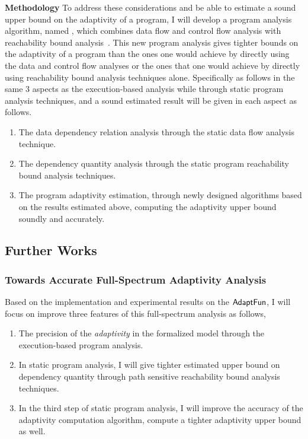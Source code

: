\begin{itemize}
\textbf{Methodology}
To address these considerations and be able to estimate a sound upper bound on the adaptivity of a program, 
I will develop a program analysis algorithm, named {\THESYSTEM}, which combines data flow and control flow analysis with reachability bound analysis~\cite{GulwaniZ10}. 
This new program analysis gives tighter bounds on the adaptivity of a program than the ones one would achieve by directly using the data and control flow analyses or the ones that one would achieve by directly using reachability bound analysis techniques alone. Specifically as follows in the same 3 aspects as the execution-based analysis 
while through static program analysis techniques, and a sound estimated result will be given in each aspect as follows.
\begin{enumerate}
\item The data dependency relation analysis through the static data flow analysis technique.
\item The dependency quantity analysis through the static program reachability bound analysis techniques.
\item The program adaptivity estimation, through newly designed algorithms based on the results estimated above, 
computing the adaptivity upper bound soundly 
and accurately.
\end{enumerate}
\end{itemize}%

\subsection{Further Works}
\subsubsection{Towards Accurate Full-Spectrum Adaptivity Analysis}
\label{subsec:intro-improve}
Based on the implementation and experimental results on the $\textsf{AdaptFun}$,
I will focus on improve three features of this full-spectrum analysis as follows,
\begin{enumerate}
   \item The precision of the \emph{adaptivity} in the formalized model through the execution-based program analysis.

\item  In static program analysis, I will give tighter estimated upper bound on dependency quantity through 
path sensitive reachability bound analysis techniques. 

\item In the third step of static program analysis, I will improve the accuracy of the adaptivity computation algorithm,
compute a tighter adaptivity upper bound as well.
\end{enumerate}

